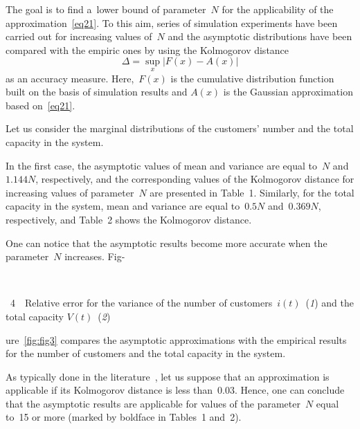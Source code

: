 \begin{multicols}{2}
The goal is to find a~lower bound of parameter~$N$ for the applicability 
of the approximation~\eqref{eq21}. To this aim,  series of
 simulation experiments have been  carried out for increasing values of~$N$ and 
  the asymptotic
  distributions    have been compared with the
  empiric ones by using the Kolmogorov distance~\cite{lit3,lit6}
$$
\Delta=\sup\limits_x\left| F\left( x\right) -A\left( x\right) \right| 
$$
as an accuracy measure. Here,~$F(x)$ is the cumulative distribution function 
built on the basis of simulation results and $A(x)$ is the Gaussian 
approximation based on~\eqref{eq21}.

Let us consider the marginal distributions of the customers' number and the 
total capacity in the system.

In the first case, the asymptotic values of mean and variance are equal 
to~$N$ and~$1.144 N$, respectively, and the corresponding values of the 
Kolmogorov distance for increasing values of parameter~$N$ are presented in 
Table~1. Similarly, for the total capacity in the system, 
mean and variance are equal to~$0.5 N$ and~$0.369 N$, respectively, and 
Table~2 shows the Kolmogorov distance.


One can notice that the asymptotic results become more accurate 
when the parameter~$N$  increases. Fig-\linebreak\vspace*{-12pt}

 { \begin{center}  %
 \vspace*{-1pt}
 \mbox{%
 \epsfxsize=77.763mm 
 }


\end{center}


\noindent
{{\figurename~4}\ \ \small{Relative error for the variance of the number of customers~$i(t)$~(\textit{1}) 
and the total capacity $V(t)$~(\textit{2})}}
}

\vspace*{18pt}

\addtocounter{figure}{1}


\noindent
ure~\ref{fig:fig3}  
compares the asymptotic approximations with the empirical results for 
the number of customers and the total capacity in the system.



As typically done in the literature~\cite{lit6}, let us suppose that 
an approximation is applicable if its Kolmogorov distance is less than~0.03. 
Hence, one can  conclude that the asymptotic results are applicable for values
 of the parameter~$N$ equal to~15 or more (marked by boldface in 
 Tables~1 and~2).
 




\end{multicols}
